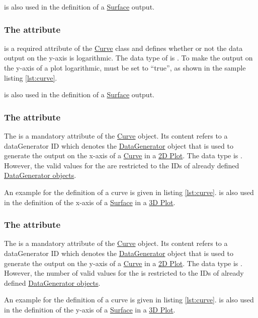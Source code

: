  is also used in the definition of a \hyperref[class:surface]{Surface} output.

\subsubsection{The  attribute}
\label{sec:logY}
 is a required attribute of the \hyperref[class:curve]{Curve} class and defines whether or not the data output on the y-axis is logarithmic. The data type of  is . 
To make the output on the y-axis of a plot logarithmic,  must be set to ``true'', as shown in the sample listing \ref{lst:curve}. 

 is also used in the definition of a \hyperref[class:surface]{Surface} output.

\subsubsection{The  attribute}
\label{sec:xDataReference}
The  is a mandatory attribute of the \hyperref[class:curve]{Curve} object. Its content refers to a dataGenerator ID which denotes the \hyperref[class:dataGenerator]{DataGenerator} object that is used to generate the output on the x-axis of a \hyperref[class:curve]{Curve} in a \hyperref[class:plot2D]{2D Plot}. 
The  data type is . However, the valid values for the  are restricted to the IDs of already defined \hyperref[class:dataGenerator]{DataGenerator objects}.

An example for the definition of a curve is given in listing \ref{lst:curve}.
 is also used in the definition of the x-axis of a \hyperref[class:surface]{Surface} in a \hyperref[class:plot3D]{3D Plot}.

\subsubsection{The  attribute}
\label{sec:yDataReference}
The  is a mandatory attribute of the \hyperref[class:curve]{Curve} object. Its content refers to a dataGenerator ID which denotes the \hyperref[class:dataGenerator]{DataGenerator} object that is used to generate the output on the y-axis of a \hyperref[class:curve]{Curve} in a \hyperref[class:plot2D]{2D Plot}.
The  data type is . However, the number of valid values for the  is restricted to the IDs of already defined \hyperref[class:dataGenerator]{DataGenerator objects}.

An example for the definition of a curve is given in listing \ref{lst:curve}.
 is also used in the definition of the y-axis of a \hyperref[class:surface]{Surface} in a \hyperref[class:plot3D]{3D Plot}.

